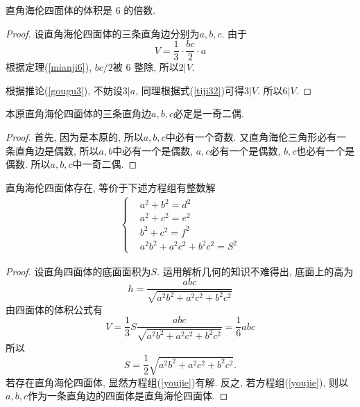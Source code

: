 \documentclass[12pt]{article}
\begin{document}
\begin{theorem}
    直角海伦四面体的体积是 6 的倍数. 
\end{theorem}
\begin{proof}
    设直角海伦四面体的三条直角边分别为$a,b,c$. 由于
    \begin{equation}\label{tiji32}
        V=\frac13\cdot\frac{bc}2\cdot a
    \end{equation}
    根据定理(\ref{mianji6}), $bc/2$被 6 整除, 所以$2|V$.\par
    根据推论(\ref{gougu3}), 不妨设$3|a$, 同理根据式(\ref{tiji32})可得$3|V$. 所以$6|V$. 
\end{proof}

\begin{theorem}
    本原直角海伦四面体的三条直角边$a,b,c$必定是一奇二偶. 
\end{theorem}
\begin{proof}
    首先, 因为是本原的, 所以$a,b,c$中必有一个奇数. 又直角海伦三角形必有一条直角边是偶数, 所以$a,b$中必有一个是偶数, $a,c$必有一个是偶数, $b,c$也必有一个是偶数. 所以$a,b,c$中一奇二偶. 
\end{proof}

\begin{theorem}
    直角海伦四面体存在, 等价于下述方程组有整数解
    \begin{align}\label{youjie}
    \begin{cases}
        &a^2+b^2=d^2\\
        &a^2+c^2=e^2\\
        &b^2+c^2=f^2\\
        &a^2b^2+a^2c^2+b^2c^2=S^2
    \end{cases}\end{align}
\end{theorem}
\begin{proof}
    设直角四面体的底面面积为$S$. 运用解析几何的知识不难得出, 底面上的高为
    \[h=\frac{abc}{\sqrt{a^2b^2+a^2c^2+b^2c^2}}\]
    由四面体的体积公式有
    \[V=\frac13S\frac{abc}{\sqrt{a^2b^2+a^2c^2+b^2c^2}}=\frac16abc\]
    所以
    \[S=\frac12\sqrt{a^2b^2+a^2c^2+b^2c^2}.\]
    若存在直角海伦四面体, 显然方程组(\ref{youjie})有解. 反之, 若方程组(\ref{youjie}), 则以$a,b,c$作为一条直角边的四面体是直角海伦四面体. 
\end{proof}
\end{document}
